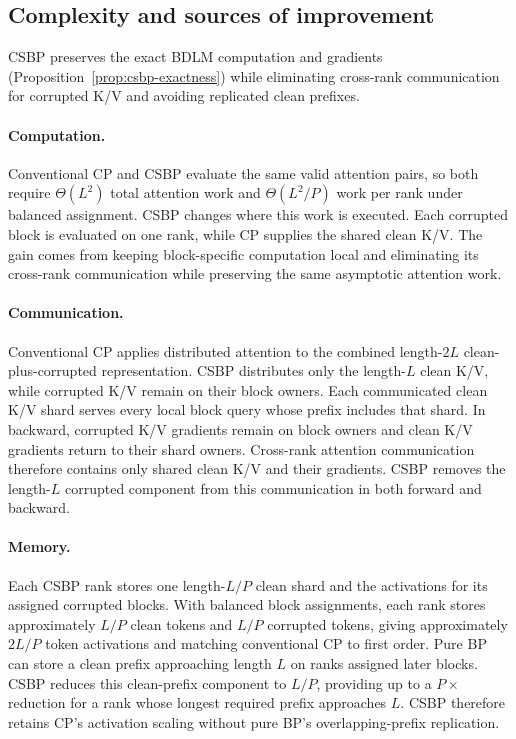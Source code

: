 \subsection{Complexity and sources of improvement}
\label{sec:complexity-analysis}

CSBP preserves the exact BDLM computation and gradients
(Proposition~\ref{prop:csbp-exactness}) while eliminating cross-rank
communication for corrupted K/V and avoiding replicated clean prefixes.

\paragraph{Computation.}
Conventional CP and CSBP evaluate the same valid attention pairs, so
both require $\Theta(L^2)$ total attention work and $\Theta(L^2/P)$ work per
rank under balanced assignment. CSBP changes where this work is
executed. Each corrupted block is evaluated on one rank, while CP supplies the
shared clean K/V. The gain comes from keeping block-specific computation local
and eliminating its cross-rank communication while preserving the same
asymptotic attention work.

\paragraph{Communication.}
Conventional CP applies distributed attention to the combined length-$2L$
clean-plus-corrupted representation. CSBP distributes only the
length-$L$ clean K/V, while corrupted K/V remain on their block owners. Each
communicated clean K/V shard serves every local block query whose prefix
includes that shard. In backward, corrupted K/V gradients remain on block
owners and clean K/V gradients return to their shard owners. Cross-rank
attention communication therefore contains only shared clean K/V and their
gradients. CSBP removes the length-$L$ corrupted component from this
communication in both forward and backward.

\paragraph{Memory.}
Each CSBP rank stores one length-$L/P$ clean shard and the activations for its
assigned corrupted blocks. With balanced block assignments, each rank stores
approximately $L/P$ clean tokens and $L/P$ corrupted tokens, giving
approximately $2L/P$ token activations and matching conventional CP to first
order. Pure BP can store a clean prefix approaching length $L$ on ranks
assigned later blocks. CSBP reduces this clean-prefix component to
$L/P$, providing up to a $P\times$ reduction for a rank whose longest required
prefix approaches $L$. CSBP therefore retains CP's activation scaling
without pure BP's overlapping-prefix replication.
